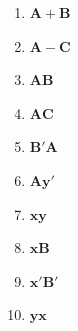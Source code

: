 \begin{enumerate}
	\item $\bm{A}+\bm{B}$
	\item $\bm{A}-\bm{C}$
	\item $\bm{AB}$
	\item $\bm{AC}$
	\item $\bm{B}'\bm{A}$
	\item $\bm{A}\bm{y}'$
	\item $\bm{xy}$
	\item $\bm{xB}$
	\item $\bm{x}'\bm{B}'$
	\item $\bm{yx}$
\end{enumerate}
